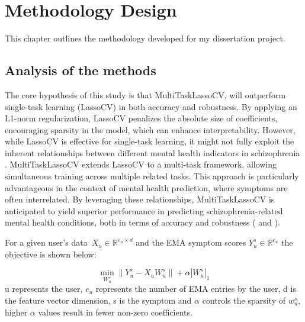 \def\baselinestretch{1}

\chapter{Methodology Design}

\def\baselinestretch{1.44}


This chapter outlines the methodology developed for my dissertation project. 
   
\smallskip

\goodbreak
\section{Analysis of the methods}
The core hypothesis of this study is that MultiTaskLassoCV, will outperform single-task learning (LassoCV) in both accuracy and robustness. By applying an L1-norm regularization, LassoCV penalizes the absolute size of coefficients, encouraging sparsity in the model, which can enhance interpretability. However, while LassoCV is effective for single-task learning, it might not fully exploit the inherent relationships between different mental health indicators in schizophrenia \citep{tibshirani1996regression}. MultiTaskLassoCV extends LassoCV to a multi-task framework, allowing simultaneous training across multiple related tasks. This approach is particularly advantageous in the context of mental health prediction, where symptoms are often interrelated. By leveraging these relationships, MultiTaskLassoCV is anticipated to yield superior performance in predicting schizophrenia-related mental health conditions, both in terms of accuracy and robustness (\citep{zhou2011malsar} and \citep{tseng2020using}). 

For a given user's data~\(X_{u} \in \mathbb{R}^{e_{u} \times d}\) and the EMA symptom scores \(Y_u^s \in \mathbb{R}^{e_{u}}\)  the objective is shown below: 

\[\min_{W_u^s} \| Y_u^s - X_u W_u^s \| + \alpha | W_u^s|_{1}\] u represents the user, \(e_{u}\)  represents the number of EMA entries by the user, d is the feature vector dimension, s is the symptom and  \(\alpha\) controls the sparsity of \(w_u^s\), higher \(\alpha\) values result in fewer non-zero coefficients.

